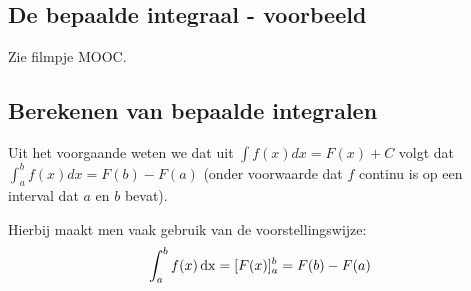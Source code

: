 %
%
%
%
%
%


\subsection{De bepaalde integraal - voorbeeld}
Zie filmpje MOOC.

\subsection{Berekenen van bepaalde integralen}

Uit het voorgaande weten we dat uit $\int f(x)dx=F(x)+C$ volgt dat $\int^b_a f(x)dx=F(b)-F(a)$ (onder voorwaarde dat $f$ continu is op een interval dat $a$ en $b$ bevat).

Hierbij maakt men vaak gebruik van de voorstellingswijze: 
\begin{equation*}
\int_{a}^{b} f(x) \operatorname{dx} = [F(x)]_a^b = F(b)-F(a)
\end{equation*}

